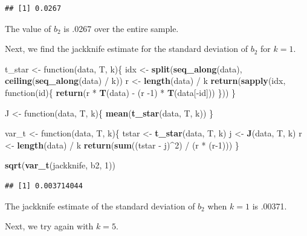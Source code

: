 \documentclass[]{article}
\newenvironment{Shaded}{\begin{snugshade}}{\end{snugshade}}
\newcommand{\KeywordTok}[1]{\textcolor[rgb]{0.13,0.29,0.53}{\textbf{{#1}}}}
\newcommand{\DecValTok}[1]{\textcolor[rgb]{0.00,0.00,0.81}{{#1}}}
\newcommand{\StringTok}[1]{\textcolor[rgb]{0.31,0.60,0.02}{{#1}}}
\newcommand{\NormalTok}[1]{{#1}}
\begin{document}
\begin{verbatim}
## [1] 0.0267
\end{verbatim}

The value of \(b_2\) is .0267 over the entire sample.

Next, we find the jackknife estimate for the standard deviation of
\(b_{2}\) for \(k=1\).

\begin{Shaded}
\begin{Highlighting}[]
\NormalTok{t_star <-}\StringTok{ }\NormalTok{function(data, T, k)\{}
  \NormalTok{idx <-}\StringTok{ }\KeywordTok{split}\NormalTok{(}\KeywordTok{seq_along}\NormalTok{(data), }\KeywordTok{ceiling}\NormalTok{(}\KeywordTok{seq_along}\NormalTok{(data) /}\StringTok{  }\NormalTok{k))}
  \NormalTok{r <-}\StringTok{ }\KeywordTok{length}\NormalTok{(data) /}\StringTok{ }\NormalTok{k}
  \KeywordTok{return}\NormalTok{(}\KeywordTok{sapply}\NormalTok{(idx, function(id)\{}
    \KeywordTok{return}\NormalTok{(r *}\StringTok{ }\KeywordTok{T}\NormalTok{(data) -}\StringTok{ }\NormalTok{(r -}\DecValTok{1}\NormalTok{) *}\StringTok{ }\KeywordTok{T}\NormalTok{(data[-id]))}
  \NormalTok{\}))}
\NormalTok{\}}

\NormalTok{J <-}\StringTok{ }\NormalTok{function(data, T, k)\{}
  \KeywordTok{mean}\NormalTok{(}\KeywordTok{t_star}\NormalTok{(data, T, k))}
\NormalTok{\}}

\NormalTok{var_t <-}\StringTok{ }\NormalTok{function(data, T, k)\{}
  \NormalTok{tstar <-}\StringTok{ }\KeywordTok{t_star}\NormalTok{(data, T, k)}
  \NormalTok{j <-}\StringTok{ }\KeywordTok{J}\NormalTok{(data, T, k)}
  \NormalTok{r <-}\StringTok{ }\KeywordTok{length}\NormalTok{(data) /}\StringTok{ }\NormalTok{k}
  \KeywordTok{return}\NormalTok{(}\KeywordTok{sum}\NormalTok{((tstar -}\StringTok{ }\NormalTok{j)^}\DecValTok{2}\NormalTok{) /}\StringTok{ }\NormalTok{(r *}\StringTok{ }\NormalTok{(r}\DecValTok{-1}\NormalTok{)))}
\NormalTok{\}}


\KeywordTok{sqrt}\NormalTok{(}\KeywordTok{var_t}\NormalTok{(jackknife, b2, }\DecValTok{1}\NormalTok{))}
\end{Highlighting}
\end{Shaded}

\begin{verbatim}
## [1] 0.003714044
\end{verbatim}

The jackknife estimate of the standard deviation of \(b_2\) when \(k=1\)
is .00371.

Next, we try again with \(k=5\).
\end{document}
